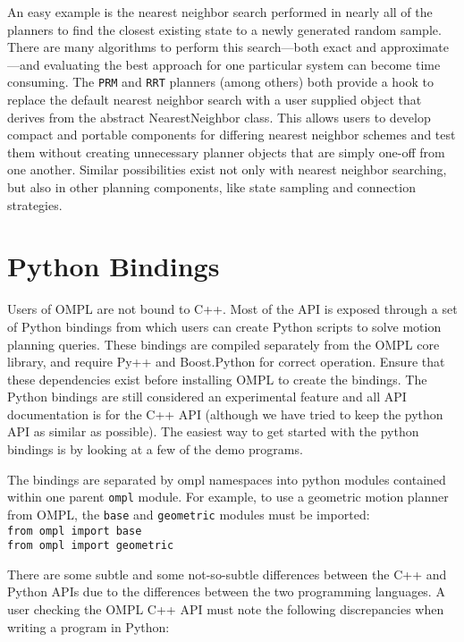 An easy example is the nearest neighbor search performed in nearly all of the
planners to find the closest existing state to a newly generated random sample.
There are many algorithms to perform this search---both exact and
approximate---and evaluating the best approach for one particular system can become time
consuming.  The {\tt PRM} and {\tt RRT} planners (among others) both provide a
hook to replace the default nearest neighbor search with a user supplied
object that derives from the abstract NearestNeighbor class.  This allows users
to develop compact and portable components for differing nearest neighbor
schemes and test them without creating unnecessary planner objects that are
simply one-off from one another.  Similar possibilities exist not only with
nearest neighbor searching, but also in other planning components, like state
sampling and connection strategies.

\section {Python Bindings}
Users of OMPL are not bound to C++.  Most of the API is exposed through a set
of Python bindings from which users can create Python scripts to solve motion
planning queries.  These bindings are compiled separately from the OMPL core
library, and require Py++ and Boost.Python for correct operation.  Ensure that
these dependencies exist before installing OMPL to create the bindings. The
Python bindings are still considered an experimental feature and all API
documentation is for the C++ API (although we have tried to keep the python API
as similar as possible). The easiest way to get started with the python bindings
is by looking at a few of the demo programs.

The bindings are separated by ompl namespaces into python modules contained
within one parent {\tt ompl} module.  For example, to use a geometric motion
planner from OMPL, the {\tt base} and {\tt geometric} modules must be imported:
\\
{\tt from ompl import base\\
from ompl import geometric}

There are some subtle and some not-so-subtle differences between the C++ and
Python APIs due to the differences between the two programming languages.  A
user checking the OMPL C++ API must note the following discrepancies when
writing a program in Python:

